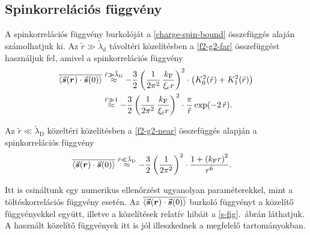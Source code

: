 \documentclass[a4paper,12pt,titlepage]{article}
\newcommand{\RR}{{\vb*{r}}}
\newcommand{\kF}{{k_\text{F}}}
\begin{document}
\subsection{Spinkorrelációs függvény}

A spinkorrelációs függvény burkolóját a \eqref{charge-spin-bound} összefüggés alaján számolhatjuk ki.  Az $\tilde{r} \gg \tilde{\lambda}_\text{d}$ távoltéri közelítésben a \eqref{f2-g2-far} összefüggést használjuk fel, amivel a spinkorrelációs függvény
\begin{equation}
\begin{split}
	\overline{\expval{\va*{s}(\RR) \cdot \va*{s}(0)}} & \stackrel{\tilde{r} \gg \tilde{\lambda}_\text{D}}{\approx} -\frac{3}{2} \left( \frac{1}{2 \pi^2} \, \frac{\kF}{\xi_\text{c} r} \right)^2 \cdot \left( K_0^2(\tilde{r}) + K_1^2(\tilde{r}) \right) \\
	& \stackrel{\tilde{r} \gg 1}{\approx} -\frac{3}{2} \left( \frac{1}{2 \pi^2} \, \frac{\kF}{\xi_\text{c} r} \right)^2 \cdot \frac{\pi}{\tilde{r}} \exp(-2 \, \tilde{r}).
\end{split}
\end{equation}

Az $\tilde{r} \ll \tilde{\lambda}_\text{D}$ közeltéri közelítésben a \eqref{f2-g2-near} összefüggés alapján a spinkorrelációs függvény
\begin{equation}
\begin{split}
	\overline{\expval{\va*{s}(\RR) \cdot \va*{s}(0)}} & \stackrel{\tilde{r} \ll \tilde{\lambda}_\text{D}}{\approx} -\frac{3}{2} \left( \frac{1}{2 \pi^2} \right)^2 \cdot \frac{1 + \left( \kF r \right)^2}{r^6}.
\end{split}
\end{equation}

Itt is csináltunk egy numerikus ellenőrzést ugyanolyan paraméterekkel, mint a töltéskorrelációs függvény esetén.  Az $\overline{\expval{\va*{s}(\RR) \cdot \va*{s}(0)}}$ burkoló függvényt a közelítő függvényekkel együtt, illetve a közelítések relatív hibáit a \ref{s-fig}.\ ábrán láthatjuk.  A használt közelítő függvények itt is jól illeszkednek a megfelelő tartományokban.
\end{document}

